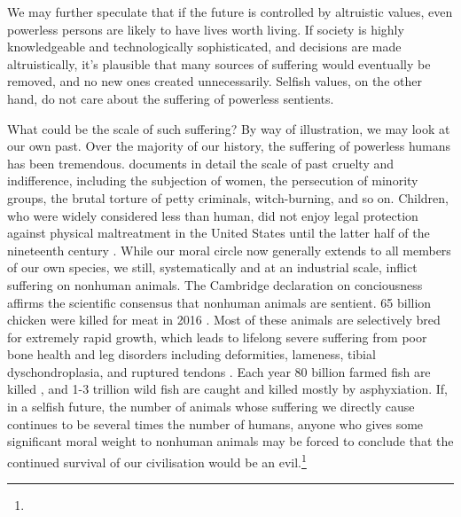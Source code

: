 \documentclass[british]{article}
\begin{document}

We may further speculate that if the future is controlled by altruistic values, even powerless persons are likely to have lives worth living. If society is highly knowledgeable and technologically sophisticated, and decisions are made altruistically, it's plausible that many sources of suffering would eventually be removed, and no new ones created unnecessarily. Selfish values, on the other hand, do not care about the suffering of powerless sentients.

What could be the scale of such suffering? By way of illustration, we may look at our own past. Over the majority of our history, the suffering of powerless humans has been tremendous. \cite{pinker_better_2011} documents in detail the scale of past cruelty and indifference, including the subjection of women, the persecution of minority groups, the brutal torture of petty criminals, witch-burning, and so on. Children, who were widely considered less than human, did not enjoy legal protection against physical maltreatment in the United States until the latter half of the nineteenth century \citep[chapter 7]{pinker_better_2011}. While our moral circle now generally extends to all members of our own species, we still, systematically and at an industrial scale, inflict suffering on nonhuman animals. The Cambridge declaration on conciousness \citep{low_cambridge_2012} affirms the scientific consensus that nonhuman animals are sentient. 65 billion chicken were killed for meat in 2016 \citep{food_and_agriculture_organization_of_the_united_nations_faostat_????}. Most of these animals are selectively bred for extremely rapid growth, which leads to lifelong severe suffering from poor bone health and leg disorders including deformities, lameness, tibial dyschondroplasia, and ruptured tendons \citep{the_humane_society_of_the_united_states_welfare_2013}. Each year 80 billion farmed fish are killed \citep{mood_estimating_2012}, and 1-3 trillion wild fish are caught \citep{mood_estimating_2010} and killed mostly by asphyxiation. If, in a selfish future, the number of animals whose suffering we directly cause continues to be several times the number of humans, anyone who gives some significant moral weight to nonhuman animals may be forced to conclude that the continued survival of our civilisation would be an evil.\footnote{
}
\end{document}
